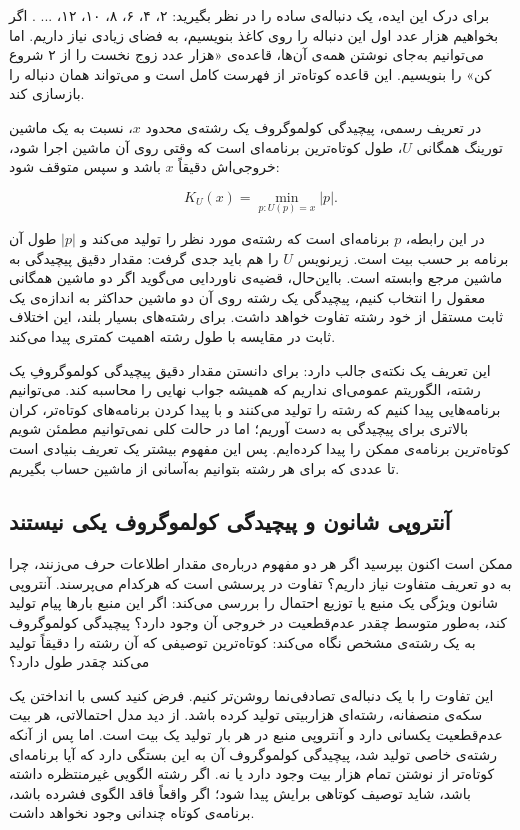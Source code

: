 برای درک این ایده، یک دنباله‌ی ساده را در نظر بگیرید: ۲، ۴، ۶، ۸، ۱۰، ۱۲، ... . اگر بخواهیم هزار عدد اول این دنباله را روی کاغذ بنویسیم، به فضای زیادی نیاز داریم. اما می‌توانیم به‌جای نوشتن همه‌ی آن‌ها، قاعده‌ی «هزار عدد زوج نخست را از ۲ شروع کن» را بنویسیم. این قاعده کوتاه‌تر از فهرست کامل است و می‌تواند همان دنباله را بازسازی کند.

در تعریف رسمی، پیچیدگی کولموگروف یک رشته‌ی محدود \(x\)، نسبت به یک ماشین تورینگ همگانی \(U\)، طول کوتاه‌ترین برنامه‌ای است که وقتی روی آن ماشین اجرا شود، خروجی‌اش دقیقاً \(x\) باشد و سپس متوقف شود:

\[
K_U(x)=\min_{p:U(p)=x}|p|.
\]

در این رابطه، \(p\) برنامه‌ای است که رشته‌ی مورد نظر را تولید می‌کند و \(|p|\) طول آن برنامه بر حسب بیت است. زیرنویس \(U\) را هم باید جدی گرفت: مقدار دقیق پیچیدگی به ماشین مرجع وابسته است. بااین‌حال، قضیه‌ی ناوردایی می‌گوید اگر دو ماشین همگانی معقول را انتخاب کنیم، پیچیدگی یک رشته روی آن دو ماشین حداکثر به اندازه‌ی یک ثابت مستقل از خود رشته تفاوت خواهد داشت. برای رشته‌های بسیار بلند، این اختلاف ثابت در مقایسه با طول رشته اهمیت کمتری پیدا می‌کند. \autocite{kolmogorov1965,livitanyi2008}

این تعریف یک نکته‌ی جالب دارد: برای دانستن مقدار دقیق پیچیدگی کولموگروفِ یک رشته، الگوریتم عمومی‌ای نداریم که همیشه جواب نهایی را محاسبه کند. می‌توانیم برنامه‌هایی پیدا کنیم که رشته را تولید می‌کنند و با پیدا کردن برنامه‌های کوتاه‌تر، کران بالاتری برای پیچیدگی به دست آوریم؛ اما در حالت کلی نمی‌توانیم مطمئن شویم کوتاه‌ترین برنامه‌ی ممکن را پیدا کرده‌ایم. پس این مفهوم بیشتر یک تعریف بنیادی است تا عددی که برای هر رشته بتوانیم به‌آسانی از ماشین حساب بگیریم. \autocite{vitanyi2020}

\subsection{آنتروپی شانون و پیچیدگی کولموگروف یکی نیستند}
\label{sub:shannon-vs-kolmogorov}

ممکن است اکنون بپرسید اگر هر دو مفهوم درباره‌ی مقدار اطلاعات حرف می‌زنند، چرا به دو تعریف متفاوت نیاز داریم؟ تفاوت در پرسشی است که هرکدام می‌پرسند. آنتروپی شانون ویژگی یک منبع یا توزیع احتمال را بررسی می‌کند: اگر این منبع بارها پیام تولید کند، به‌طور متوسط چقدر عدم‌قطعیت در خروجی آن وجود دارد؟ پیچیدگی کولموگروف به یک رشته‌ی مشخص نگاه می‌کند: کوتاه‌ترین توصیفی که آن رشته را دقیقاً تولید می‌کند چقدر طول دارد؟

این تفاوت را با یک دنباله‌ی تصادفی‌نما روشن‌تر کنیم. فرض کنید کسی با انداختن یک سکه‌ی منصفانه، رشته‌ای هزاربیتی تولید کرده باشد. از دید مدل احتمالاتی، هر بیت عدم‌قطعیت یکسانی دارد و آنتروپی منبع در هر بار تولید یک بیت است. اما پس از آنکه رشته‌ی خاصی تولید شد، پیچیدگی کولموگروف آن به این بستگی دارد که آیا برنامه‌ای کوتاه‌تر از نوشتن تمام هزار بیت وجود دارد یا نه. اگر رشته الگویی غیرمنتظره داشته باشد، شاید توصیف کوتاهی برایش پیدا شود؛ اگر واقعاً فاقد الگوی فشرده باشد، برنامه‌ی کوتاه چندانی وجود نخواهد داشت.

